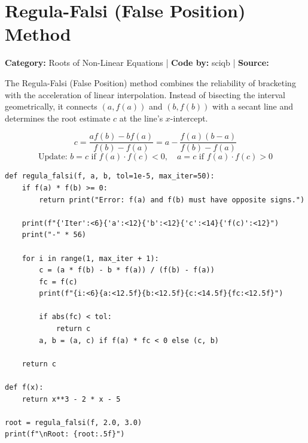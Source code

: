 \documentclass[10pt,a4paper]{report}
\begin{document}
\newpage


\section{Regula-Falsi (False Position) Method}
\textbf{Category:} \textcolor{secondary}{Roots of Non-Linear Equations} \quad | \quad \textbf{Code by:} \textcolor{secondary}{sciqb} \quad | \quad \textbf{Source:} \texttt{}

The Regula-Falsi (False Position) method combines the reliability of bracketing with the acceleration of linear interpolation. Instead of bisecting the interval geometrically, it connects $(a, f(a))$ and $(b, f(b))$ with a secant line and determines the root estimate $c$ at the line's $x$-intercept.

\begin{tcolorbox}[colback=theorybg,colframe=theoryframe,title=\textbf{Mathematical Theory \& Formulation},boxrule=1pt,arc=2mm]
\[
c = \frac{a f(b) - b f(a)}{f(b) - f(a)} = a - \frac{f(a)(b - a)}{f(b) - f(a)}
\]
\[
\text{Update: } b = c \text{ if } f(a) \cdot f(c) < 0, \quad a = c \text{ if } f(a) \cdot f(c) > 0
\]
\end{tcolorbox}

\begin{tcolorbox}[colback=codebg,colframe=secondary,title=\textbf{Python Implementation (Step-by-Step Functions)},boxrule=1pt,arc=2mm]
\begin{lstlisting}[style=python_detailed]
def regula_falsi(f, a, b, tol=1e-5, max_iter=50):
    if f(a) * f(b) >= 0:
        return print("Error: f(a) and f(b) must have opposite signs.")

    print(f"{'Iter':<6}{'a':<12}{'b':<12}{'c':<14}{'f(c)':<12}")
    print("-" * 56)

    for i in range(1, max_iter + 1):
        c = (a * f(b) - b * f(a)) / (f(b) - f(a))
        fc = f(c)
        print(f"{i:<6}{a:<12.5f}{b:<12.5f}{c:<14.5f}{fc:<12.5f}")

        if abs(fc) < tol:
            return c
        a, b = (a, c) if f(a) * fc < 0 else (c, b)

    return c

def f(x):
    return x**3 - 2 * x - 5

root = regula_falsi(f, 2.0, 3.0)
print(f"\nRoot: {root:.5f}")


\end{lstlisting}
\end{tcolorbox}
\end{document}
